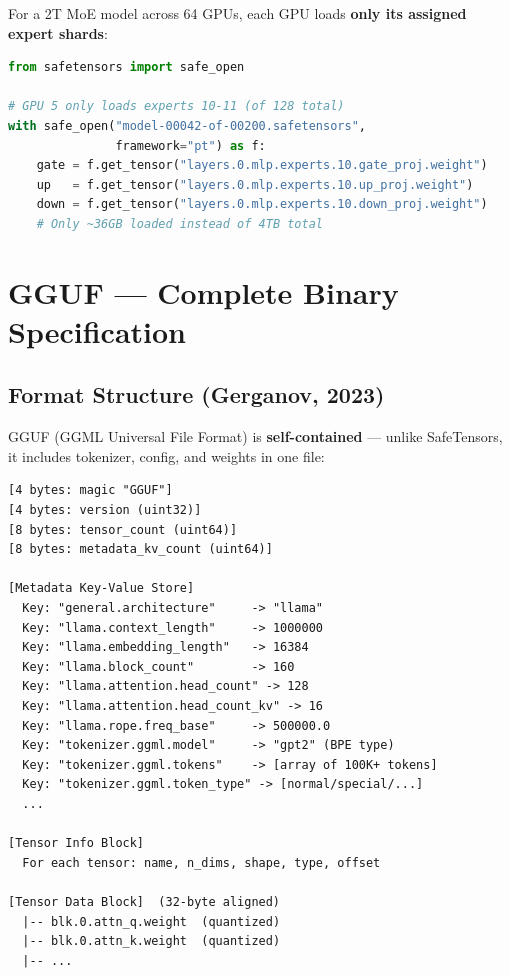 \documentclass[11pt,a4paper]{article}
\begin{document}
For a 2T MoE model across 64 GPUs, each GPU loads \textbf{only its assigned expert shards}:

\begin{lstlisting}[language=Python, caption={Lazy Loading Specific Experts}]
from safetensors import safe_open

# GPU 5 only loads experts 10-11 (of 128 total)
with safe_open("model-00042-of-00200.safetensors", 
               framework="pt") as f:
    gate = f.get_tensor("layers.0.mlp.experts.10.gate_proj.weight")
    up   = f.get_tensor("layers.0.mlp.experts.10.up_proj.weight")
    down = f.get_tensor("layers.0.mlp.experts.10.down_proj.weight")
    # Only ~36GB loaded instead of 4TB total
\end{lstlisting}

\section{GGUF --- Complete Binary Specification}

\subsection{Format Structure (Gerganov, 2023)}

GGUF (GGML Universal File Format) is \textbf{self-contained} --- unlike SafeTensors, it includes tokenizer, config, and weights in one file:

\begin{lstlisting}[basicstyle=\ttfamily\small, caption={GGUF Binary Layout}]
[4 bytes: magic "GGUF"]
[4 bytes: version (uint32)]
[8 bytes: tensor_count (uint64)]
[8 bytes: metadata_kv_count (uint64)]

[Metadata Key-Value Store]
  Key: "general.architecture"     -> "llama"
  Key: "llama.context_length"     -> 1000000
  Key: "llama.embedding_length"   -> 16384
  Key: "llama.block_count"        -> 160
  Key: "llama.attention.head_count" -> 128
  Key: "llama.attention.head_count_kv" -> 16
  Key: "llama.rope.freq_base"     -> 500000.0
  Key: "tokenizer.ggml.model"     -> "gpt2" (BPE type)
  Key: "tokenizer.ggml.tokens"    -> [array of 100K+ tokens]
  Key: "tokenizer.ggml.token_type" -> [normal/special/...]
  ...

[Tensor Info Block]
  For each tensor: name, n_dims, shape, type, offset

[Tensor Data Block]  (32-byte aligned)
  |-- blk.0.attn_q.weight  (quantized)
  |-- blk.0.attn_k.weight  (quantized)
  |-- ...
\end{lstlisting}
\end{document}
